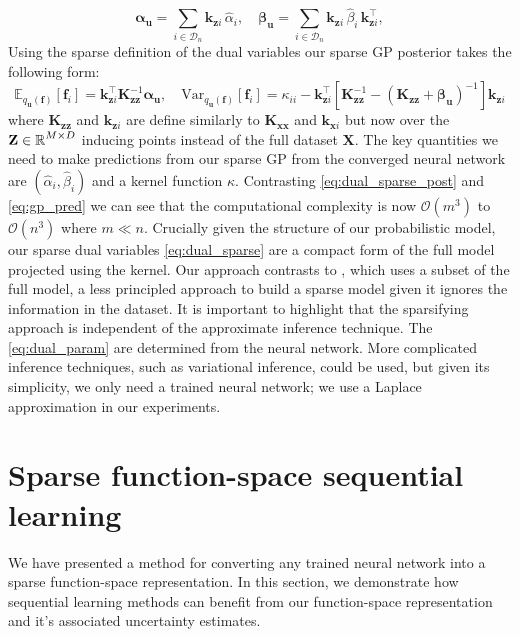 \documentclass{article}
\newcommand{\mathbold}[1]{\bm{#1}}
\newcommand{\mbf}[1]{\mathbf{#1}}
\newcommand{\MZ}{\mbf{Z}}
\newcommand{\MX}{\mbf{X}}
\newcommand{\T}{\top}
\newcommand{\valpha}[0]{\mathbold{\alpha}}
\newcommand{\vbeta}[0]{\mathbold{\beta}}
\newcommand{\vf}{\mbf{f}}
\newcommand{\vu}{\mbf{u}}
\newcommand{\vx}{\mbf{x}}
\newcommand{\MKzz}{\mbf{K}_{\mbf{z}\mbf{z}}}
\newcommand{\MKxx}{\mbf{K}_{\mbf{x}\mbf{x}}}
\newcommand{\vkzi}{\mbf{k}_{\mbf{z}i}}
\newcommand{\vkzs}{\mbf{k}_{\mbf{z}i}}
\newcommand{\vk}{\mbf{k}}
\newcommand{\myexpect}{\mathbb{E}}
\begin{document}
\begin{equation} 
	\valpha_{\vu}  =  \sum_{i \in \mathcal{D}_{n}}  \vkzi \, \hat{\alpha}_{i}, \quad
	\vbeta_{\vu} =  \sum_{i \in \mathcal{D}_{n}} \vkzi \,\hat{\beta}_{i} \, \vkzi^{\T} ,    
\label{eq:dual_sparse}
\end{equation}
Using the sparse definition of the dual variables our sparse GP posterior takes the following form:
\begin{equation}\label{eq:dual_sparse_post}
   \myexpect_{q_{\vu}(\vf)}[\vf_i] = \vkzs^{\T} \MKzz^{-1}   \valpha_{\vu} , \quad 
   \textrm{Var}_{q_{\vu}(\vf)}[\vf_i]  = \kappa_{ii} - \vkzs^\top [\MKzz^{-1} - (\MKzz + \vbeta_{\vu})^{-1} ]\vkzs
\end{equation}
where $\MKzz$ and $\vkzs$ are define similarly to $\MKxx$ and $\vk_{\vx i}$ but now over the $\MZ \in \R^{M \times D} $ inducing points instead of the full dataset $\MX$. The key quantities we need to make predictions from our sparse GP from the converged neural network are $(\hat{\alpha}_i, \hat{\beta}_i)$ and a kernel function $\kappa$. Contrasting \cref{eq:dual_sparse_post} and \cref{eq:gp_pred} we can see that the computational complexity is now $\mathcal{O}(m^3)$ to $\mathcal{O}(n^3)$ where $m \ll n$.  Crucially given the structure of our probabilistic model, our sparse dual variables \cref{eq:dual_sparse} are a compact form of the full model projected using the kernel. Our approach contrasts to \citet{immerImprovingPredictionsBayesian2021}, which uses a subset of the full model, a less principled approach to build a sparse model given it ignores the information in the dataset. It is important to highlight that the sparsifying approach is independent of the approximate inference technique. The \cref{eq:dual_param} are determined from the neural network. More complicated inference techniques, such as variational inference, could be used, but given its simplicity, we only need a trained neural network; we use a Laplace approximation in our experiments.




\section{Sparse function-space sequential learning}

We have presented a method for converting any trained neural network into a sparse function-space representation.
In this section, we demonstrate how sequential learning methods can benefit from our function-space representation and it's associated uncertainty estimates.
\end{document}
